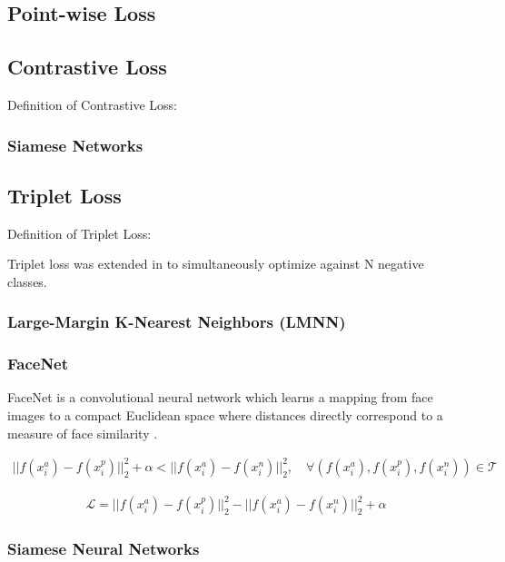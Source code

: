 	\subsection{Point-wise Loss}
	
	\subsection{Contrastive Loss}
	Definition of Contrastive Loss:
	
		\subsubsection{Siamese Networks}
	
	\subsection{Triplet Loss}
	
	Definition of Triplet Loss:
	
	Triplet loss was extended in \cite{Sohn2016NPairLoss} to simultaneously optimize against N negative classes.

		\subsubsection{Large-Margin K-Nearest Neighbors (LMNN)}
		
		\subsubsection{FaceNet}
		
		FaceNet is a convolutional neural network which learns a mapping from face images to a compact Euclidean space where distances directly correspond to a measure of face similarity \cite{Schroff2015FaceNet}. 
		
		\begin{align}
			||f(x^{a}_{i}) - f(x^{p}_{i})||^{2}_{2} + \alpha < ||f(x^{a}_{i}) - f(x^{n}_{i})||^{2}_{2}, \quad \forall (f(x^{a}_{i}),f(x^{p}_{i}),f(x^{n}_{i})) \in \mathcal{T}
		\end{align} 
	
		\begin{align}
			\mathcal{L} = ||f(x^{a}_{i}) - f(x^{p}_{i})||^{2}_{2} -||f(x^{a}_{i}) - f(x^{n}_{i})||^{2}_{2} + \alpha
		\end{align}
		
		
		\subsubsection{Siamese Neural Networks}
	
